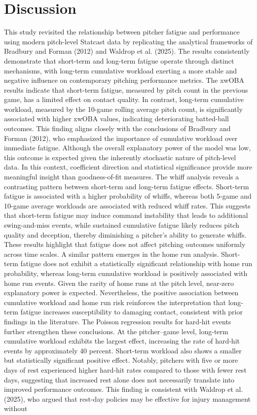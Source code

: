\documentclass[12pt, letterpaper]{article}
\begin{document}
\section{Discussion}
  This study revisited the relationship between pitcher fatigue and performance using modern pitch-level Statcast data by replicating the analytical frameworks of Bradbury and Forman (2012) and Waldrop et al. (2025). The results consistently demonstrate that short-term and long-term fatigue operate through distinct mechanisms, with long-term cumulative workload exerting a more stable and negative influence on contemporary pitching performance metrics. The xwOBA results indicate that short-term fatigue, measured by pitch count in the previous game, has a limited effect on contact quality. In contrast, long-term cumulative workload, measured by the 10-game rolling average pitch count, is significantly associated with higher xwOBA values, indicating deteriorating batted-ball outcomes. This finding aligns closely with the conclusions of Bradbury and Forman (2012), who emphasized the importance of cumulative workload over immediate fatigue. Although the overall explanatory power of the model was low, this outcome is expected given the inherently stochastic nature of pitch-level data. In this context, coefficient direction and statistical significance provide more meaningful insight than goodness-of-fit measures. The whiff analysis reveals a contrasting pattern between short-term and long-term fatigue effects. Short-term fatigue is associated with a higher probability of whiffs, whereas both 5-game and 10-game average workloads are associated with reduced whiff rates. This suggests that short-term fatigue may induce command instability that leads to additional swing-and-miss events, while sustained cumulative fatigue likely reduces pitch quality and deception, thereby diminishing a pitcher’s ability to generate whiffs. These results highlight that fatigue does not affect pitching outcomes uniformly across time scales. A similar pattern emerges in the home run analysis. Short-term fatigue does not exhibit a statistically significant relationship with home run probability, whereas long-term cumulative workload is positively associated with home run events. Given the rarity of home runs at the pitch level, near-zero explanatory power is expected. Nevertheless, the positive association between cumulative workload and home run risk reinforces the interpretation that long-term fatigue increases susceptibility to damaging contact, consistent with prior findings in the literature. The Poisson regression results for hard-hit events further strengthen these conclusions. At the pitcher--game level, long-term cumulative workload exhibits the largest effect, increasing the rate of hard-hit events by approximately 40 percent. Short-term workload also shows a smaller but statistically significant positive effect. Notably, pitchers with five or more days of rest experienced higher hard-hit rates compared to those with fewer rest days, suggesting that increased rest alone does not necessarily translate into improved performance outcomes. This finding is consistent with Waldrop et al. (2025), who argued that rest-day policies may be effective for injury management without 
\end{document}

